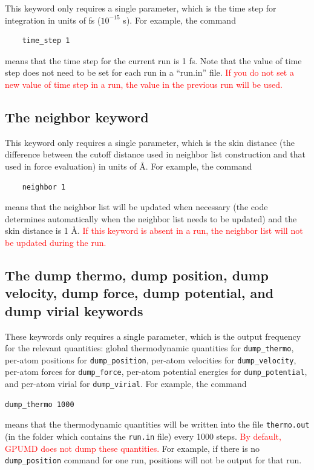\documentclass[12pt,a4paper]{report}
\begin{document}
This keyword only requires a single parameter, which is the time step for integration in units of fs ($10^{-15}$ s). For example, the command
\begin{verbatim}
    time_step 1
\end{verbatim}
means that the time step for the current run is 1 fs. Note that the value of time step does not need to be set for each run in a ``run.in'' file. \textcolor{red}{If you do not set a new value of time step in a run, the value in the previous run will be used.}



\subsection{The neighbor keyword}

This keyword only requires a single parameter, which is the skin distance (the difference between the cutoff distance used in neighbor list construction and that used in force evaluation) in units of \AA. For example, the command
\begin{verbatim}
    neighbor 1
\end{verbatim}
means that the neighbor list will be updated when necessary (the code determines automatically when the neighbor list needs to be updated) and the skin distance is 1 \AA. \textcolor{red}{If this keyword is absent in a run, the neighbor list will not be updated during the run.}


\subsection{The dump thermo, dump position, dump velocity, dump force, dump potential, and dump virial keywords}

These keywords only requires a single parameter, which is the output frequency for the relevant quantities: global thermodynamic quantities for \verb"dump_thermo", per-atom positions for  \verb"dump_position", per-atom velocities for \verb"dump_velocity",  per-atom forces for \verb"dump_force", per-atom  potential energies for \verb"dump_potential", and per-atom virial for \verb"dump_virial".
For example, the command
\begin{verbatim}
dump_thermo 1000
\end{verbatim}
means that the thermodynamic quantities will be written into the file \verb"thermo.out" (in the folder which contains the \verb"run.in" file) every 1000 steps.
\textcolor{red}{By default, GPUMD does not dump these quantities.} For example, if there is no \verb"dump_position" command for one run, positions will not be output for that run.
\end{document}
